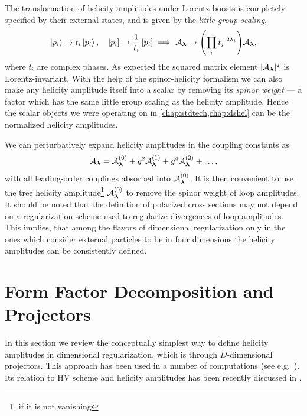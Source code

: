 The transformation of helicity amplitudes under Lorentz boosts is completely specified by their 
external states, and is given by the \emph{little group scaling},
\begin{equation}
  \ket{p_i} \to t_i \ket{p_i}, \quad  \left\vert p_i \right] \to \frac{1}{t_i} \left\vert p_i \right] \implies \mathcal{A}_{\vb*{\lambda}} \to  \qty(\prod_i t_i^{-2\lambda_i}) \mathcal{A}_{\vb*{\lambda}},
\end{equation}
where $t_i$ are complex phases.
As expected the squared matrix element $\vert \mathcal{A}_{\vb*{\lambda}}{} \vert^2$ is Lorentz-invariant.
With the help of the spinor-helicity formalism we can also make any helicity amplitude itself into a scalar
by removing its \emph{spinor weight} --- a factor which has the same little group scaling
as the helicity amplitude.
Hence the scalar objects we were operating on in \cref{chap:stdtech,chap:dshel} can be the normalized helicity amplitudes.

We can perturbatively expand helicity amplitudes in the coupling constants as
\begin{equation}
  \mathcal{A}_{\vb*{\lambda}} =  \mathcal{A}_{\vb*{\lambda}}^{(0)} + g^2 \mathcal{A}_{\vb*{\lambda}}^{(1)} + g^4 \mathcal{A}_{\vb*{\lambda}}^{(2)} + \ldots{},
\end{equation}
with all leading-order couplings absorbed into $\mathcal{A}_{\vb*{\lambda}}^{(0)}$.
It is then convenient to use the tree helicity amplitude\footnote{if it is not vanishing} $\mathcal{A}_{\vb*{\lambda}} ^{(0)}$ to remove the spinor weight
of loop amplitudes.
It should be noted that the definition of polarized cross sections may not depend on a regularization scheme
used to regularize divergences of loop amplitudes. This implies, that 
among the flavors of dimensional regularization only in the ones which consider external particles 
to be in four dimensions the helicity amplitudes can be consistently defined.


\section{Form Factor Decomposition and Projectors}
\label{sec:helampl_projectors}

In this section we review the conceptually simplest way to define helicity amplitudes in dimensional regularization, which is through $D$-dimensional projectors.
This approach has been used in a number of computations (see e.g.\ \cite{Garland:2002ak, Moch:2002hm, Glover:2003cm, Glover:2004si,Gehrmann:2009vu,Gehrmann:2011aa}).
Its relation to HV scheme and helicity amplitudes has been recently discussed in \cite{Peraro:2019cjj}.

